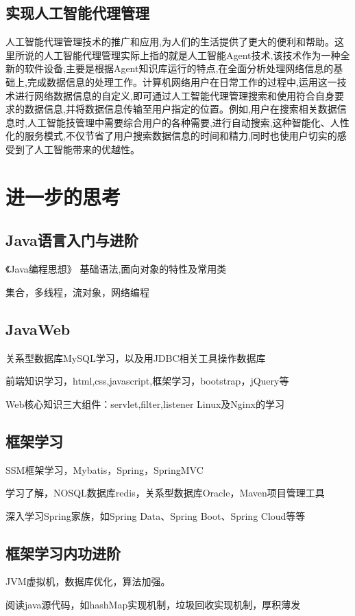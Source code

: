 \documentclass{article}
\begin{document}
\subsection{实现人工智能代理管理}
人工智能代理管理技术的推广和应用,为人们的生活提供了更大的便利和帮助。这里所说的人工智能代理管理实际上指的就是人工智能Agent技术,该技术作为一种全新的软件设备,主要是根据Agent知识库运行的特点,在全面分析处理网络信息的基础上,完成数据信息的处理工作。计算机网络用户在日常工作的过程中,运用这一技术进行网络数据信息的自定义,即可通过人工智能代理管理搜索和使用符合自身要求的数据信息,并将数据信息传输至用户指定的位置。例如,用户在搜索相关数据信息时,人工智能技管理中需要综合用户的各种需要,进行自动搜索,这种智能化、人性化的服务模式,不仅节省了用户搜索数据信息的时间和精力,同时也使用户切实的感受到了人工智能带来的优越性。
\section{进一步的思考}
\subsection{Java语言入门与进阶}
        《Java编程思想》\citep{java}
        基础语法,面向对象的特性及常用类

        集合，多线程，流对象，网络编程
\subsection{JavaWeb} 
       关系型数据库MySQL学习，以及用JDBC相关工具操作数据库

       前端知识学习，html,css,javascript,框架学习，bootstrap，jQuery等

       Web核心知识三大组件：servlet,filter,listener
       Linux及Nginx的学习
 \subsection{框架学习} 
      SSM框架学习，Mybatis，Spring，SpringMVC

       学习了解，NOSQL数据库redis，关系型数据库Oracle，Maven项目管理工具

       深入学习Spring家族，如Spring Data、Spring Boot、Spring Cloud等等
 \subsection{框架学习内功进阶} 
      JVM虚拟机，数据库优化，算法加强。

       阅读java源代码，如hashMap实现机制，垃圾回收实现机制，厚积薄发
\end{document}
